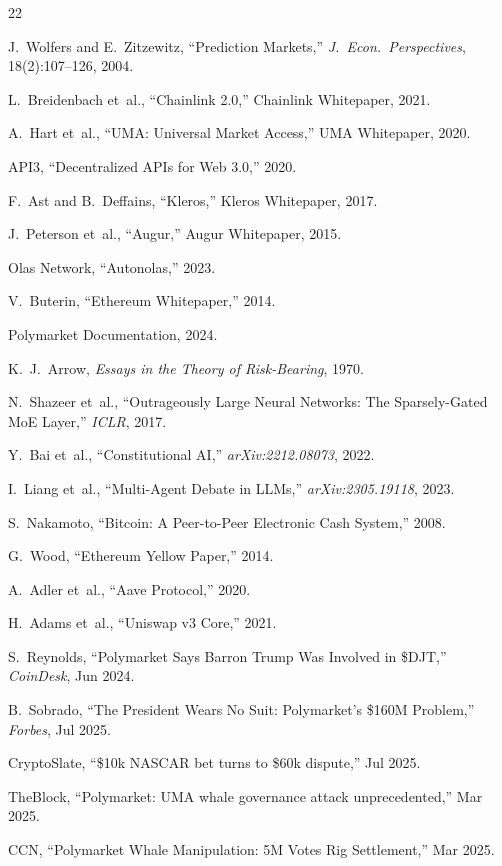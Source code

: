 \documentclass[11pt,a4paper,twocolumn]{article}
\begin{document}
\begin{thebibliography}{22}
\scriptsize

J.~Wolfers and E.~Zitzewitz, ``Prediction Markets,'' \emph{J.~Econ.~Perspectives}, 18(2):107--126, 2004.

L.~Breidenbach et~al., ``Chainlink 2.0,'' Chainlink Whitepaper, 2021.

A.~Hart et~al., ``UMA: Universal Market Access,'' UMA Whitepaper, 2020.

API3, ``Decentralized APIs for Web 3.0,'' 2020.

F.~Ast and B.~Deffains, ``Kleros,'' Kleros Whitepaper, 2017.

J.~Peterson et~al., ``Augur,'' Augur Whitepaper, 2015.

Olas Network, ``Autonolas,'' 2023.

V.~Buterin, ``Ethereum Whitepaper,'' 2014.

Polymarket Documentation, 2024.

K.~J.~Arrow, \emph{Essays in the Theory of Risk-Bearing}, 1970.

N.~Shazeer et~al., ``Outrageously Large Neural Networks: The Sparsely-Gated MoE Layer,'' \emph{ICLR}, 2017.

Y.~Bai et~al., ``Constitutional AI,'' \emph{arXiv:2212.08073}, 2022.

I.~Liang et~al., ``Multi-Agent Debate in LLMs,'' \emph{arXiv:2305.19118}, 2023.

S.~Nakamoto, ``Bitcoin: A Peer-to-Peer Electronic Cash System,'' 2008.

G.~Wood, ``Ethereum Yellow Paper,'' 2014.

A.~Adler et~al., ``Aave Protocol,'' 2020.

H.~Adams et~al., ``Uniswap v3 Core,'' 2021.

S.~Reynolds, ``Polymarket Says Barron Trump Was Involved in \$DJT,'' \emph{CoinDesk}, Jun 2024.

B.~Sobrado, ``The President Wears No Suit: Polymarket's \$160M Problem,'' \emph{Forbes}, Jul 2025.

CryptoSlate, ``\$10k NASCAR bet turns to \$60k dispute,'' Jul 2025.

TheBlock, ``Polymarket: UMA whale governance attack unprecedented,'' Mar 2025.

CCN, ``Polymarket Whale Manipulation: 5M Votes Rig Settlement,'' Mar 2025.

\end{thebibliography}
\end{document}
